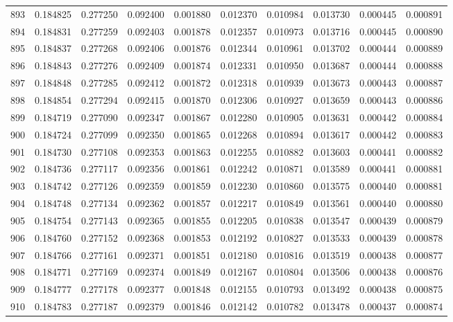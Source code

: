 \begin{tabular}{lrrrrrrrrr}
893 & 0.184825 & 0.277250 & 0.092400 & 0.001880 & 0.012370 & 0.010984 & 0.013730 & 0.000445 & 0.000891 \\
894 & 0.184831 & 0.277259 & 0.092403 & 0.001878 & 0.012357 & 0.010973 & 0.013716 & 0.000445 & 0.000890 \\
895 & 0.184837 & 0.277268 & 0.092406 & 0.001876 & 0.012344 & 0.010961 & 0.013702 & 0.000444 & 0.000889 \\
896 & 0.184843 & 0.277276 & 0.092409 & 0.001874 & 0.012331 & 0.010950 & 0.013687 & 0.000444 & 0.000888 \\
897 & 0.184848 & 0.277285 & 0.092412 & 0.001872 & 0.012318 & 0.010939 & 0.013673 & 0.000443 & 0.000887 \\
898 & 0.184854 & 0.277294 & 0.092415 & 0.001870 & 0.012306 & 0.010927 & 0.013659 & 0.000443 & 0.000886 \\
899 & 0.184719 & 0.277090 & 0.092347 & 0.001867 & 0.012280 & 0.010905 & 0.013631 & 0.000442 & 0.000884 \\
900 & 0.184724 & 0.277099 & 0.092350 & 0.001865 & 0.012268 & 0.010894 & 0.013617 & 0.000442 & 0.000883 \\
901 & 0.184730 & 0.277108 & 0.092353 & 0.001863 & 0.012255 & 0.010882 & 0.013603 & 0.000441 & 0.000882 \\
902 & 0.184736 & 0.277117 & 0.092356 & 0.001861 & 0.012242 & 0.010871 & 0.013589 & 0.000441 & 0.000881 \\
903 & 0.184742 & 0.277126 & 0.092359 & 0.001859 & 0.012230 & 0.010860 & 0.013575 & 0.000440 & 0.000881 \\
904 & 0.184748 & 0.277134 & 0.092362 & 0.001857 & 0.012217 & 0.010849 & 0.013561 & 0.000440 & 0.000880 \\
905 & 0.184754 & 0.277143 & 0.092365 & 0.001855 & 0.012205 & 0.010838 & 0.013547 & 0.000439 & 0.000879 \\
906 & 0.184760 & 0.277152 & 0.092368 & 0.001853 & 0.012192 & 0.010827 & 0.013533 & 0.000439 & 0.000878 \\
907 & 0.184766 & 0.277161 & 0.092371 & 0.001851 & 0.012180 & 0.010816 & 0.013519 & 0.000438 & 0.000877 \\
908 & 0.184771 & 0.277169 & 0.092374 & 0.001849 & 0.012167 & 0.010804 & 0.013506 & 0.000438 & 0.000876 \\
909 & 0.184777 & 0.277178 & 0.092377 & 0.001848 & 0.012155 & 0.010793 & 0.013492 & 0.000438 & 0.000875 \\
910 & 0.184783 & 0.277187 & 0.092379 & 0.001846 & 0.012142 & 0.010782 & 0.013478 & 0.000437 & 0.000874 \\

\end{tabular}
